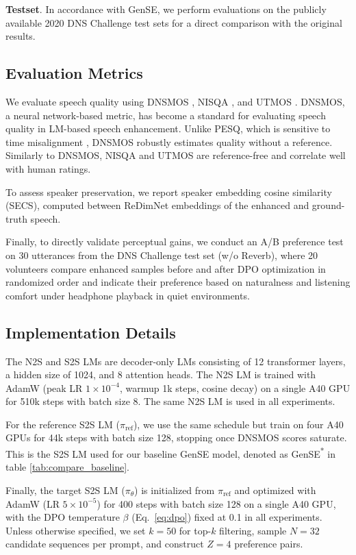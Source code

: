 \documentclass{article}
\begin{document}
\noindent\textbf{Testset}. In accordance with GenSE, we perform evaluations on the publicly available 2020 DNS Challenge \cite{reddy2020interspeech} test sets for a direct comparison with the original results.

\subsection{Evaluation Metrics}
We evaluate speech quality using DNSMOS \cite{reddy2021dnsmos}, NISQA \cite{mittag2021nisqa}, and UTMOS \cite{saeki2022utmos}. DNSMOS, a neural network-based metric, has become a standard for evaluating speech quality in LM-based speech enhancement. Unlike PESQ, which is sensitive to time misalignment \cite{wang2024selm, li2024masksr, li2025speech}, DNSMOS robustly estimates quality without a reference. Similarly to DNSMOS, NISQA and UTMOS are reference-free and correlate well with human ratings. 

To assess speaker preservation, we report speaker embedding cosine similarity (SECS), computed between ReDimNet \cite{yakovlev2024reshape} embeddings of the enhanced and ground-truth speech. 

Finally, to directly validate perceptual gains, we conduct an A/B preference test on 30 utterances from the DNS Challenge test set (w/o Reverb), where 20 volunteers compare enhanced samples before and after DPO optimization in randomized order and indicate their preference based on naturalness and listening comfort under headphone playback in quiet environments.

\subsection{Implementation Details}
The N2S and S2S LMs are decoder-only LMs consisting of 12 transformer layers, a hidden size of 1024, and 8 attention heads. The N2S LM is trained with AdamW (peak LR $1\!\times\!10^{-4}$, warmup 1k steps, cosine decay) on a single A40 GPU for 510k steps with batch size 8. The same N2S LM is used in all experiments.

For the reference S2S LM ($\pi_{\text{ref}}$), we use the same schedule but train on four A40 GPUs for 44k steps with batch size 128, stopping once DNSMOS scores saturate. This is the S2S LM used for our baseline GenSE model, denoted as GenSE\textsuperscript{*} in table \ref{tab:compare_baseline}.

Finally, the target S2S LM ($\pi_\theta$) is initialized from $\pi_{\text{ref}}$ and optimized with AdamW (LR $5\!\times\!10^{-5}$) for 400 steps with batch size 128 on a single A40 GPU, with the DPO temperature $\beta$ (Eq.~\ref{eq:dpo}) fixed at 0.1 in all experiments. Unless otherwise specified, we set $k=50$ for top-$k$ filtering, sample $N=32$ candidate sequences per prompt, and construct $Z=4$ preference pairs.
\end{document}
